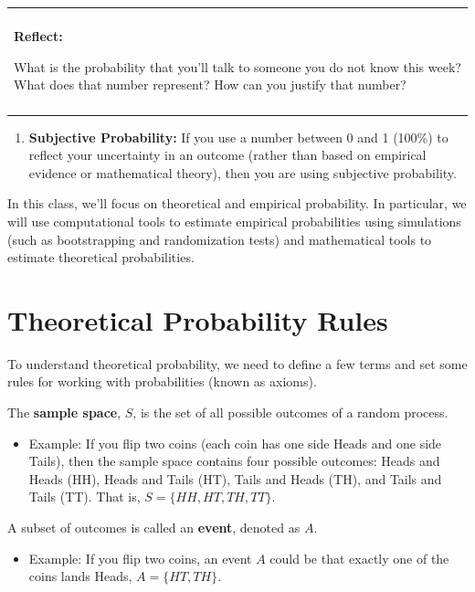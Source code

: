 \documentclass[
]{book}
\providecommand{\tightlist}{%
  \setlength{\itemsep}{0pt}\setlength{\parskip}{0pt}}
\newenvironment{reflect}
{
    \begin{center}
    
    \begin{tabular}{|p{0.8\textwidth}|}
    \rowcolor{LightBlue}
    \hline\\
    \rowcolor{LightBlue}
    \textbf{Reflect:}
}
{
    \\\rowcolor{LightBlue}
    \\\hline
    \end{tabular} 
    \end{center}
}
\begin{document}
\begin{reflect}
What is the probability that you'll talk to someone you do not know this
week? What does that number represent? How can you justify that number?
\end{reflect}

\begin{enumerate}
\def\labelenumi{\arabic{enumi}.}
\setcounter{enumi}{2}
\tightlist
\item
  \textbf{Subjective Probability:} If you use a number between 0 and 1 (100\%) to reflect your uncertainty in an outcome (rather than based on empirical evidence or mathematical theory), then you are using subjective probability.
\end{enumerate}

In this class, we'll focus on theoretical and empirical probability. In particular, we will use computational tools to estimate empirical probabilities using simulations (such as bootstrapping and randomization tests) and mathematical tools to estimate theoretical probabilities.

\hypertarget{theoretical-probability-rules}{%
\section{Theoretical Probability Rules}\label{theoretical-probability-rules}}

To understand theoretical probability, we need to define a few terms and set some rules for working with probabilities (known as axioms).

The \textbf{sample space}, \(S\), is the set of all possible outcomes of a random process.

\begin{itemize}
\tightlist
\item
  Example: If you flip two coins (each coin has one side Heads and one side Tails), then the sample space contains four possible outcomes: Heads and Heads (HH), Heads and Tails (HT), Tails and Heads (TH), and Tails and Tails (TT). That is, \(S = \{HH,HT,TH,TT\}\).
\end{itemize}

A subset of outcomes is called an \textbf{event}, denoted as \(A\).

\begin{itemize}
\tightlist
\item
  Example: If you flip two coins, an event \(A\) could be that exactly one of the coins lands Heads, \(A = \{HT,TH\}\).
\end{itemize}
\end{document}
